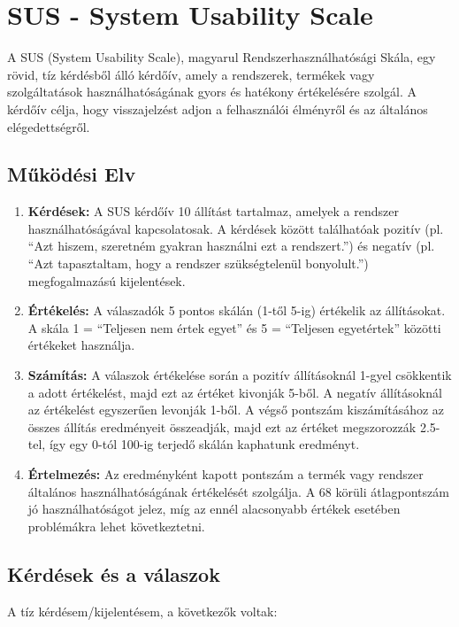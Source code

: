 \section{SUS - System Usability Scale}

A SUS (System Usability Scale), magyarul Rendszerhasználhatósági Skála, egy rövid, tíz kérdésből álló kérdőív, amely a rendszerek, termékek vagy szolgáltatások használhatóságának gyors és hatékony értékelésére szolgál. 
A kérdőív célja, hogy visszajelzést adjon a felhasználói élményről és az általános elégedettségről.

\subsection{Működési Elv}
\begin{enumerate}
    \item \textbf{Kérdések:} A SUS kérdőív 10 állítást tartalmaz, amelyek a rendszer használhatóságával kapcsolatosak. A kérdések között találhatóak pozitív (pl. ``Azt hiszem, szeretném gyakran használni ezt a rendszert.'') és negatív (pl. ``Azt tapasztaltam, hogy a rendszer szükségtelenül bonyolult.'') megfogalmazású kijelentések.
    
    \item \textbf{Értékelés:} A válaszadók 5 pontos skálán (1-től 5-ig) értékelik az állításokat. A skála 1 = ``Teljesen nem értek egyet'' és 5 = ``Teljesen egyetértek'' közötti értékeket használja.
    
    \item \textbf{Számítás:} A válaszok értékelése során a pozitív állításoknál 1-gyel csökkentik a adott értékelést, majd ezt az értéket kivonják 5-ből. A negatív állításoknál az értékelést egyszerűen levonják 1-ből. A végső pontszám kiszámításához az összes állítás eredményeit összeadják, majd ezt az értéket megszorozzák 2.5-tel, így egy 0-tól 100-ig terjedő skálán kaphatunk eredményt.
    
    \item \textbf{Értelmezés:} Az eredményként kapott pontszám a termék vagy rendszer általános használhatóságának értékelését szolgálja. A 68 körüli átlagpontszám jó használhatóságot jelez, míg az ennél alacsonyabb értékek esetében problémákra lehet következtetni.
\end{enumerate}

\subsection{Kérdések és a válaszok}
A tíz kérdésem/kijelentésem, a következők voltak:

